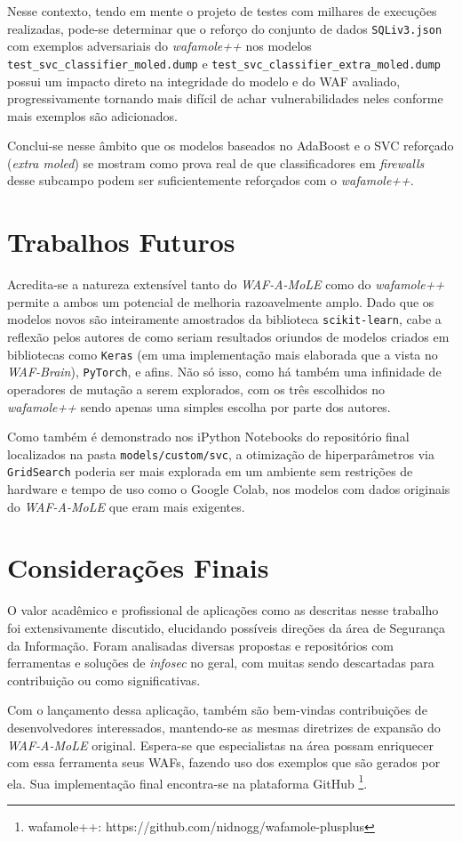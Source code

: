 Nesse contexto, tendo em mente o projeto de testes com milhares de execuções realizadas, pode-se determinar que o reforço do conjunto de dados \verb+SQLiv3.json+ com exemplos adversariais do \textit{wafamole++} nos modelos \verb+test_svc_classifier_moled.dump+ e \linebreak \verb+test_svc_classifier_extra_moled.dump+ possui um impacto direto na integridade do modelo e do WAF avaliado, progressivamente tornando mais difícil de achar vulnerabilidades neles conforme mais exemplos são adicionados.

Conclui-se nesse âmbito que os modelos baseados no AdaBoost e o SVC reforçado (\textit{extra moled}) se mostram como prova real de que classificadores em \textit{firewalls} desse subcampo podem ser suficientemente reforçados com o \textit{wafamole++}.


\section{Trabalhos Futuros}
Acredita-se a natureza extensível tanto do \textit{WAF-A-MoLE} como do \textit{wafamole++} permite a ambos um potencial de melhoria razoavelmente amplo. Dado que os modelos novos são inteiramente amostrados da biblioteca \verb+scikit-learn+, cabe a reflexão pelos autores de como seriam resultados oriundos de modelos criados em bibliotecas como \verb+Keras+ (em uma implementação mais elaborada que a vista no \textit{WAF-Brain}), \verb+PyTorch+, e afins. Não só isso, como há também uma infinidade de operadores de mutação a serem explorados, com os três escolhidos no \textit{wafamole++} sendo apenas uma simples escolha por parte dos autores.

Como também é demonstrado nos iPython Notebooks do repositório final localizados na pasta \verb+models/custom/svc+, a otimização de hiperparâmetros via \verb+GridSearch+ poderia ser mais explorada em um ambiente sem restrições de hardware e tempo de uso como o Google Colab, nos modelos com dados originais do \textit{WAF-A-MoLE} que eram mais exigentes. 

\section{Considerações Finais}
O valor acadêmico e profissional de aplicações como as descritas nesse trabalho foi extensivamente discutido, elucidando possíveis direções da área de Segurança da Informação. Foram analisadas diversas propostas e repositórios com ferramentas e soluções de \textit{infosec} no geral, com muitas sendo descartadas para contribuição ou como significativas. 

Com o lançamento dessa aplicação, também são bem-vindas contribuições de desenvolvedores interessados, mantendo-se as mesmas diretrizes de expansão do \textit{WAF-A-MoLE} original. Espera-se que especialistas na área possam enriquecer com essa ferramenta seus WAFs, fazendo uso dos exemplos que são gerados por ela. Sua implementação final encontra-se na plataforma GitHub \footnote{wafamole++:  https://github.com/nidnogg/wafamole-plusplus}.
